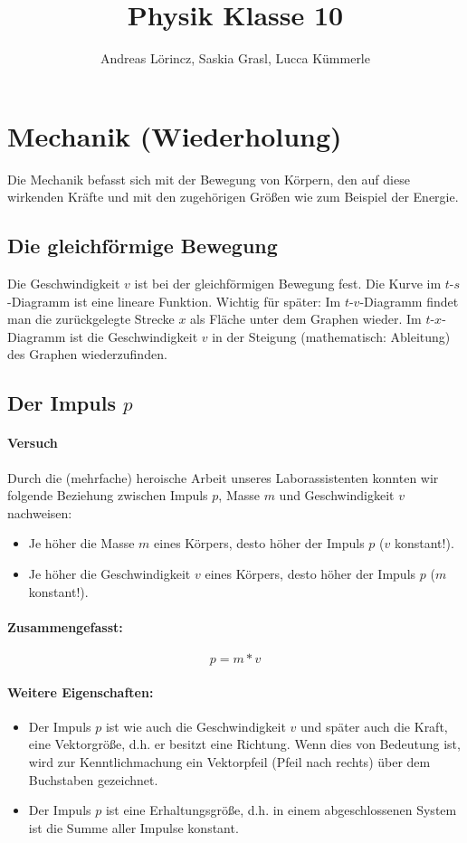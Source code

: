 \documentclass[12pt]{article}
\title{Physik Klasse 10}
\author{Andreas L\"orincz, Saskia Grasl, Lucca K\"ummerle}
\numberwithin{equation}{subsection}
\begin{document}
	\maketitle
	\tableofcontents
	
	\section{Mechanik (Wiederholung)}
	Die Mechanik befasst sich mit der Bewegung von Körpern, den auf diese wirkenden Kräfte und mit den zugehörigen Größen wie zum Beispiel der Energie.
	
	\subsection{Die gleichförmige Bewegung}
	Die Geschwindigkeit $ v $ ist bei der gleichförmigen Bewegung fest. Die Kurve im $ t $-$ s $-Diagramm ist eine lineare Funktion.
	Wichtig für später: Im $ t $-$ v $-Diagramm findet man die zurückgelegte Strecke $ x $ als Fläche unter dem Graphen wieder.
	Im $ t $-$ x $-Diagramm ist die Geschwindigkeit $ v $ in der Steigung (mathematisch: Ableitung) des Graphen wiederzufinden.
	
	\subsection{Der Impuls $p$}
	\paragraph{Versuch}
	Durch die (mehrfache) heroische Arbeit unseres Laborassistenten konnten wir folgende Beziehung zwischen Impuls $ p $, Masse $ m $ und Geschwindigkeit $ v $ nachweisen:
	\begin{itemize}
		\item Je höher die Masse $ m $ eines Körpers, desto höher der Impuls $ p $ ($ v $ konstant!).
		\item Je höher die Geschwindigkeit $ v $ eines Körpers, desto höher der Impuls $ p $ ($ m $ konstant!).
	\end{itemize}
	\paragraph{Zusammengefasst:}
	\begin{equation}
		p=m*v
	\end{equation}
	\paragraph{Weitere Eigenschaften:}
	\begin{itemize}
		\item Der Impuls $ p $ ist wie auch die Geschwindigkeit $ v $ und später auch die Kraft, eine Vektorgröße, d.h. er besitzt eine Richtung. Wenn dies von Bedeutung ist, wird zur Kenntlichmachung ein Vektorpfeil (Pfeil nach rechts) über dem Buchstaben gezeichnet.
		\item Der Impuls $ p $ ist eine Erhaltungsgröße, d.h. in einem abgeschlossenen System ist die Summe aller Impulse konstant.
	\end{itemize}
	
\end{document}
